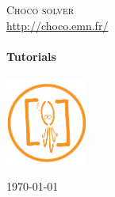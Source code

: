 \begin{titlepage}
\begin{center}
\textsc{\LARGE Choco solver}\\
\url{http://choco.emn.fr/}\\[1.5cm]

\HRule \\[0.4cm]
{ \Huge \bfseries Tutorials}\\
\HRule \\[1cm]
\includegraphics[width=0.20\textwidth]{../shared/media/logo.pdf} 

\vfill
{\large \today}
\end{center}
\end{titlepage}

\clearpage
